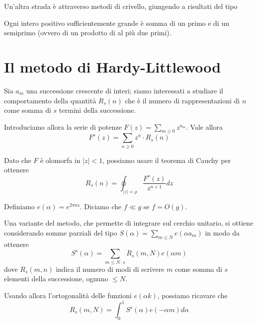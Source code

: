 Un'altra strada è attraverso metodi di crivello, giungendo a risultati del tipo
\begin{theorem}[Chen, 1973]
    Ogni intero positivo sufficientemente grande è somma di un primo e di un semiprimo (ovvero di un prodotto di al più due primi).
\end{theorem}


\section{Il metodo di Hardy-Littlewood}
Sia $a_m$ una successione crescente di interi; siamo interessati a studiare il comportamento della quantità $R_s(n)$ che è il numero di rappresentazioni di $n$ come somma di $s$ termini della successione.

Introduciamo allora la serie di potenze $F(z)=\sum_{m\ge0} z^{a_m}$. Vale allora
$$ F^s(z)=\sum_{n\ge0}z^n\cdot R_s(n)$$

Dato che $F$ è olomorfa in $|z|<1$, possiamo usare il teorema di Cauchy per ottenere
$$ R_s(n)=\oint_{|z|=\rho}\frac{F^s(z)}{z^{n+1}}dz$$

\begin{notazione}
    Definiamo $e(\alpha)=e^{2\pi i\alpha}$. Diciamo che $f\ll g$ se $f=O(g)$.
\end{notazione}

Una variante del metodo, che permette di integrare sul cerchio unitario, si ottiene considerando somme parziali del tipo $S(\alpha)=\sum_{m\le N} e(\alpha a_m)$ in modo da ottenere
$$S^s(\alpha)=\sum_{m\le N\cdot s} R_s(m,N)e(\alpha m) $$
dove $R_s(m,n)$ indica il numero di modi di scrivere $m$ come somma di $s$ elementi della successione, ognuno $\le N$.

Usando allora l'ortogonalità delle funzioni $e(\alpha k)$, possiamo ricavare che
$$R_s(m,N)=\int_{0}^{1}S^s(\alpha)e(-\alpha m)d\alpha$$

